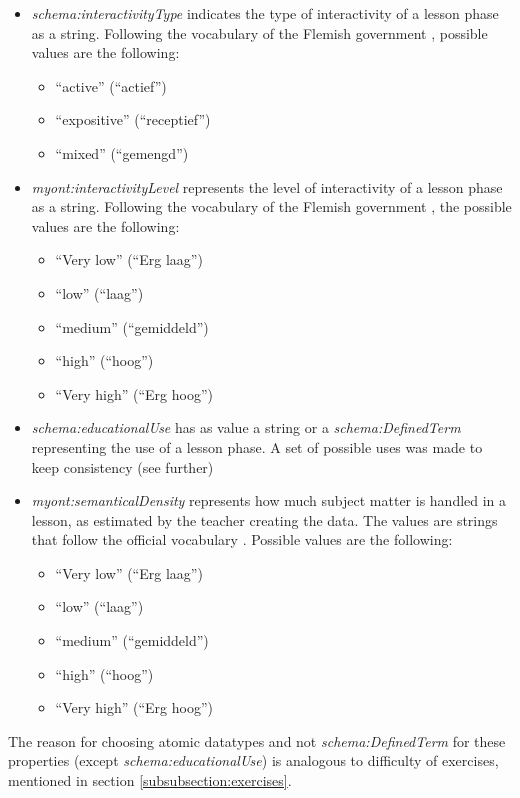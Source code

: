 \documentclass[a4paper]{report}
\begin{document}
    \begin{itemize}
        \item \emph{schema:interactivityType} indicates the type of interactivity of a lesson phase as a string. Following the vocabulary of the Flemish government \cite{pubelovoc}, possible values are the following:
        \begin{itemize}
            \item ``active'' (``actief'')
            \item ``expositive'' (``receptief'')
            \item ``mixed'' (``gemengd'')
        \end{itemize}
        \item \emph{myont:interactivityLevel} represents the level of interactivity of a lesson phase as a string. Following the vocabulary of the Flemish government \cite{pubelovoc}, the possible values are the following:
        \begin{itemize}
            \item ``Very low'' (``Erg laag'')
            \item ``low'' (``laag'')
            \item ``medium'' (``gemiddeld'')
            \item ``high'' (``hoog'')
            \item ``Very high'' (``Erg hoog'')
        \end{itemize}
        \item \emph{schema:educationalUse} has as value a string or a \textit{schema:DefinedTerm} representing the use of a lesson phase. A set of possible uses was made to keep consistency (see further)
        \item \emph{myont:semanticalDensity} represents how much subject matter is handled in a lesson, as estimated by the teacher creating the data. The values are strings that follow the official vocabulary \cite{pubelovoc}. Possible values are the following:
        \begin{itemize}
            \item ``Very low'' (``Erg laag'')
            \item ``low'' (``laag'')
            \item ``medium'' (``gemiddeld'')
            \item ``high'' (``hoog'')
            \item ``Very high'' (``Erg hoog'')
        \end{itemize}
    \end{itemize}
    The reason for choosing atomic datatypes and not \textit{schema:DefinedTerm} for these properties (except \emph{schema:educationalUse}) is analogous to difficulty of exercises, mentioned in section \ref{subsubsection:exercises}.
\end{document}
